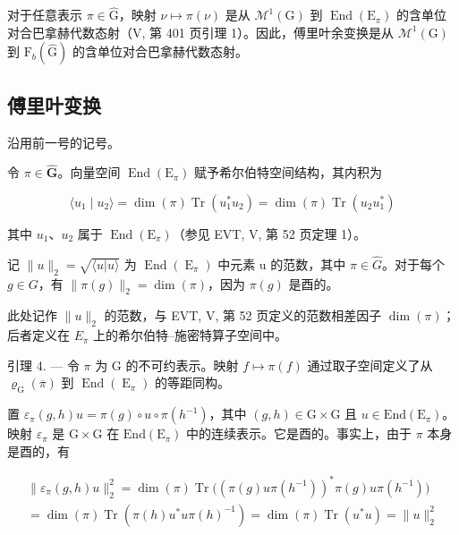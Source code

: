 对于任意表示 \(\pi \in \widehat{\mathrm{G}}\)，映射 \(\nu \mapsto \pi(\nu)\) 是从 \(\mathcal{M}^{1}(\mathrm{G})\) 到 \(\operatorname{End}(\mathrm{E}_{\pi})\) 的含单位对合巴拿赫代数态射（V, 第 401 页引理 1）。因此，傅里叶余变换是从 \(\mathcal{M}^{1}(\mathrm{G})\) 到 \(\mathrm{F}_b(\widehat{\mathrm{G}})\) 的含单位对合巴拿赫代数态射。

\subsection{傅里叶变换}

沿用前一号的记号。

令 \(\pi \in \widehat{\mathbf{G}}\)。向量空间 \(\operatorname{End}(\mathrm{E}_{\pi})\) 赋予希尔伯特空间结构，其内积为

\[
\langle u _ {1} \mid u _ {2} \rangle = \dim (\pi) \operatorname{Tr} (u _ {1} ^ {*} u _ {2}) = \dim (\pi) \operatorname{Tr} (u _ {2} u _ {1} ^ {*})
\]

其中 \(u_{1}\)、\(u_{2}\) 属于 \(\operatorname{End}(\mathrm{E}_{\pi})\)（参见 EVT, V, 第 52 页定理 1）。

记 \(\|u\|_{2} = \sqrt{\langle u|u\rangle}\) 为 \(\operatorname{End}(\operatorname{E}_{\pi})\) 中元素 u 的范数，其中 \(\pi \in \widehat{G}\)。对于每个 \(g \in G\)，有 \(\|\pi(g)\|_{2} = \dim(\pi)\)，因为 \(\pi(g)\) 是酉的。

此处记作 \(\|u\|_{2}\) 的范数，与 EVT, V, 第 52 页定义的范数相差因子 \(\dim(\pi)\)；后者定义在 \(E_{\pi}\) 上的希尔伯特–施密特算子空间中。

引理 4. --- 令 \(\pi\) 为 G 的不可约表示。映射 \(f \mapsto \pi(f)\) 通过取子空间定义了从 \(\varrho_{\mathrm{G}}(\overline{\pi})\) 到 \(\operatorname{End}(\operatorname{E}_{\pi})\) 的等距同构。

置 \(\varepsilon_{\pi}(g,h)u = \pi(g)\circ u\circ\pi(h^{-1})\)，其中 \((g,h)\in\mathrm{G}\times\mathrm{G}\) 且 \(u\in\mathrm{End}(\mathrm{E}_{\pi})\)。映射 \(\varepsilon_{\pi}\) 是 \(\mathrm{G}\times\mathrm{G}\) 在 \(\mathrm{End}(\mathrm{E}_{\pi})\) 中的连续表示。它是酉的。事实上，由于 \(\pi\) 本身是酉的，有

\[
\begin{array}{c} \| \varepsilon_ {\pi} (g, h) u \| _ {2} ^ {2} = \dim (\pi) \operatorname{Tr} \Big ((\pi (g) u \pi (h ^ {- 1})) ^ {*} \pi (g) u \pi (h ^ {- 1}) \Big) \\ = \dim (\pi) \operatorname{Tr} (\pi (h) u ^ {*} u \pi (h) ^ {- 1}) = \dim (\pi) \operatorname{Tr} (u ^ {*} u) = \| u \| _ {2} ^ {2} \end{array}
\]

